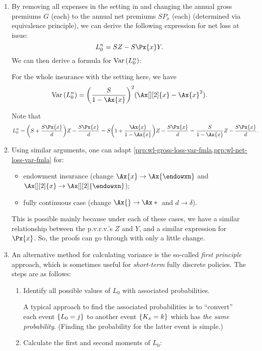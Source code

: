 \begin{enumerate}
\item By removing all expenses in the setting in 
and changing the annual gross premiums \(G\) (each) to the annual net premiums
\(SP_x\) (each) (determined via equivalence principle), we can derive the
following expression for net loss at issue:
\[
L_0^n=SZ-S\Px{x}Y.
\]
We can then derive a formula for \(\operatorname{Var}\qty(L_0^n)\):
\begin{proposition}
\label{prp:wl-net-loss-var-fmla}
For the whole insurance with the setting here, we have
\[
\vari{L_0^n}=\qty(\frac{S}{1-\Ax{x}})^{2}(\Ax[][2]{x}-\Ax{x}^2).
\]
\end{proposition}
\begin{pf}
Note that
\[
L_0^n=\qty(S+\frac{S\Px{x}}{d})Z-\frac{S\Px{x}}{d}
=S\qty(1+\frac{\Ax{x}}{1-\Ax{x}})Z-\frac{S\Px{x}}{d}
=\frac{S}{1-\Ax{x}}Z-\frac{S\Px{x}}{d}.
\]
\end{pf}
\item Using similar arguments, one can adapt
\cref{prp:wl-gross-loss-var-fmla,prp:wl-net-loss-var-fmla} for:
\begin{itemize}
\item endowment insurance (change \(\Ax{x}\to\Ax{\endowxn}\) and \(\Ax[][2]{x}\to\Ax[][2]{\endowxn}\));
\item fully continuous case (change \(\Ax{}\to\Ax*{}\) and \(d\to\delta\)).
\end{itemize}
\begin{note}
This is possible mainly because under each of these cases, we have a similar
relationship between the p.v.r.v.'s \(Z\) and \(Y\), and a similar expression
for \(\Px{x}\). So, the proofs can go through with only a little change.
\end{note}
\item \label{it:first-principle-cal-var}
An alternative method for calculating variance is the so-called \emph{first
principle} approach, which is sometimes useful for \emph{short-term} fully
discrete policies. The steps are as follows:
\begin{enumerate}
\item Identify all possible values of \(L_0\) with associated probabilities.
\begin{note}
A typical approach to find the associated probabilities is to ``convert'' each
event \(\qty{L_0=j}\) to another event \(\qty{K_x=k}\) which has \emph{the same
probability}. (Finding the probability for the latter event is simple.)
\end{note}
\item Calculate the first and second moments of \(L_0\):

\end{enumerate}
\end{enumerate}
